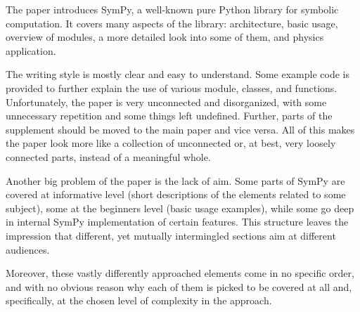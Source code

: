 \documentclass[answers,12pt]{exam}
\begin{document}
\begin{questions}
\question The paper introduces SymPy, a well-known pure Python library for
symbolic computation. It covers many aspects of the library: architecture,
basic usage, overview of modules, a more detailed look into some of them, and
physics application.

The writing style is mostly clear and easy to understand. Some example code is
provided to further explain the use of various module, classes, and functions.
Unfortunately, the paper is very unconnected and disorganized, with some
unnecessary repetition and some things left undefined. Further, parts of the
supplement should be moved to the main paper and vice versa. All of this makes
the paper look more like a collection of unconnected or, at best, very loosely
connected parts, instead of a meaningful whole.

Another big problem of the paper is the lack of aim. Some parts of SymPy are
covered at informative level (short descriptions of the elements related to
some subject), some at the beginners level (basic usage examples), while some
go deep in internal SymPy implementation of certain features. This structure
leaves the impression that different, yet mutually intermingled sections aim
at different audiences.

Moreover, these vastly differently approached elements come in no specific
order, and with no obvious reason why each of them is picked to be covered at
all and, specifically, at the chosen level of complexity in the approach.


\end{questions}
\end{document}
